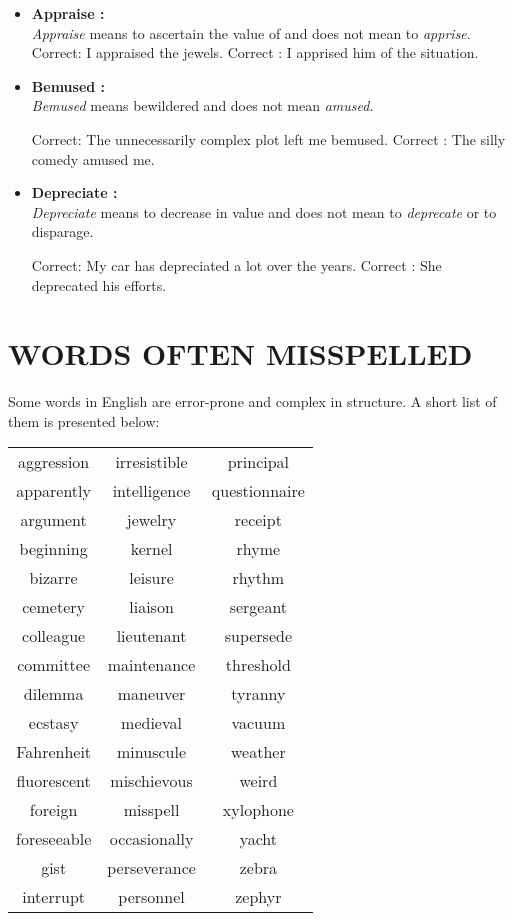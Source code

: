 \documentclass{report}
\begin{document}
\begin{itemize}
    \item
    \textbf{\Large{Appraise :}}\\    
    \textit{Appraise} means to ascertain the value of and does not mean to \textit{apprise}.
    \DoubleRowSingleCol
    {Correct: I appraised the jewels.}
    {Correct : I apprised him of the situation.}
    \bigskip
    
    \item
    \textbf{\Large{Bemused :}}\\    
    \textit{Bemused} means bewildered and does not mean \textit{amused.}

    \DoubleRowSingleCol
    {Correct: The unnecessarily complex plot left me bemused.}
    {Correct : The silly comedy amused me.}
    \bigskip
    
    \item
    \textbf{\Large{Depreciate :}}\\  
    \textit{Depreciate} means to decrease in value and does not mean to \textit{deprecate} or to disparage.
    
    \DoubleRowSingleCol
    {Correct: My car has depreciated a lot over the years.}
    {Correct : She deprecated his efforts.}
\end{itemize}


\chapter{WORDS OFTEN MISSPELLED}
Some words in English are error-prone and complex in structure. A short list of them is presented below:

\bigskip
\fontsize{15}{18}

\begin{center}
\begin{tabular}{c c c}
 aggression & irresistible & principal\\
 apparently	& intelligence & questionnaire \\
 argument & jewelry & receipt\\
 beginning & kernel & rhyme\\
 bizarre & leisure & rhythm \\
 cemetery & liaison & sergeant \\
 colleague & lieutenant & supersede\\
 committee & maintenance & threshold\\
 dilemma & maneuver & tyranny\\
 ecstasy & medieval & vacuum\\
 Fahrenheit & minuscule & weather\\
 fluorescent & mischievous & weird\\
 foreign & misspell & xylophone\\
 foreseeable & occasionally & yacht\\
 gist & perseverance & zebra\\
 interrupt & personnel & zephyr\\
\end{tabular}
\end{center}
\bigskip
\end{document}
